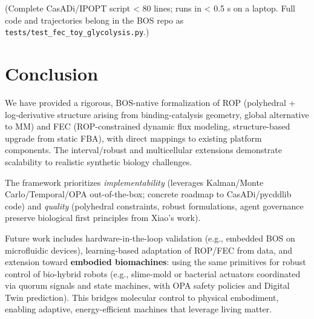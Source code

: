 \documentclass[11pt,a4paper]{article}
\begin{document}
(Complete CasADi/IPOPT script < 80 lines; runs in < 0.5 s on a laptop. Full code and trajectories belong in the BOS repo as \texttt{tests/test\_fec\_toy\_glycolysis.py}.)

\section{Conclusion}

We have provided a rigorous, BOS-native formalization of ROP (polyhedral + log-derivative structure arising from binding-catalysis geometry, global alternative to MM) and FEC (ROP-constrained dynamic flux modeling, structure-based upgrade from static FBA), with direct mappings to existing platform components. The interval/robust and multicellular extensions demonstrate scalability to realistic synthetic biology challenges.

The framework prioritizes \emph{implementability} (leverages Kalman/Monte Carlo/Temporal/OPA out-of-the-box; concrete roadmap to CasADi/pycddlib code) and \emph{quality} (polyhedral constraints, robust formulations, agent governance preserve biological first principles from Xiao's work). 

Future work includes hardware-in-the-loop validation (e.g., embedded BOS on microfluidic devices), learning-based adaptation of ROP/FEC from data, and extension toward \textbf{embodied biomachines}: using the same primitives for robust control of bio-hybrid robots (e.g., slime-mold or bacterial actuators coordinated via quorum signals and state machines, with OPA safety policies and Digital Twin prediction). This bridges molecular control to physical embodiment, enabling adaptive, energy-efficient machines that leverage living matter.
\end{document}
